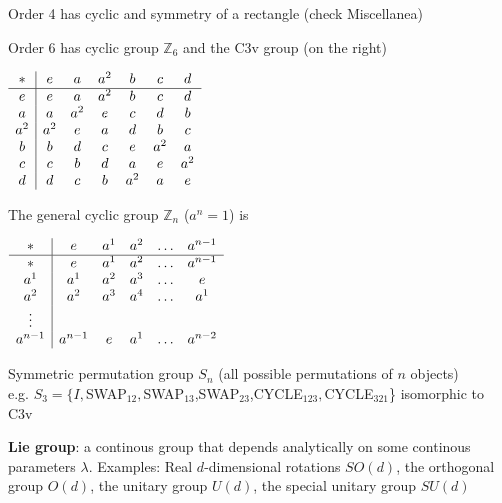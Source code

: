 \begin{squishlist}
    \item Order 4 has cyclic and symmetry of a rectangle (check Miscellanea)
    
    \begin{minipage}{0.5\columnwidth}
        \item Order 6 has cyclic group $\mathbb{Z}_6$ and the C3v group (on the right)
    \end{minipage}
    \begin{minipage}{0.5\columnwidth}
        $\begin{array}{c | c c c c c c }
            * & e & a & a^2 & b & c & d \\
            \hline
            e & e & a & a^2 & b & c & d \\
            a & a & a^2 & e & c & d & b \\
            a^2 & a^2 & e & a & d    & b    & c     \\
            b   & b  & d & c & e   & a^2 & a  \\
            c   & c  & b & d & a   & e   & a^2 \\
            d   & d  & c & b & a^2 & a   & e                        
        \end{array}$
    \end{minipage}

    \begin{minipage}{0.4\columnwidth}
    \item The general cyclic group $\mathbb{Z}_n$ ($a^n = 1$) is
    \end{minipage}
    $\begin{array}{c| c c c c c}
        * & e & a^1 & a^2 & \ldots & a^{n-1} \\
        \hline
        * & e & a^1 & a^2 & \ldots & a^{n-1} \\
        a^1 & a^1 & a^2 & a^3 & \ldots & e \\
        a^2 & a^2 & a^3 & a^4 & \ldots & a^1 \\
        {\vdots} \\
        a^{n-1} & a^{n-1} & e & a^1 & \ldots & a^{n-2}
    \end{array}$

    \item Symmetric permutation group $S_n$ (all possible permutations of $n$ objects)\\
    e.g. $S_3 = \{ I,$SWAP$_{12},$SWAP$_{13}$,SWAP$_{23}$,CYCLE$_{123},$CYCLE$_{321}$\} isomorphic to C3v

    \item \textbf{Lie group}: a continous group that depends analytically on some continous parameters $\lambda$. Examples: Real $d$-dimensional rotations $SO(d)$, the orthogonal group $O(d)$, the unitary group $U(d)$, the special unitary group $SU(d)$
    

\end{squishlist}

